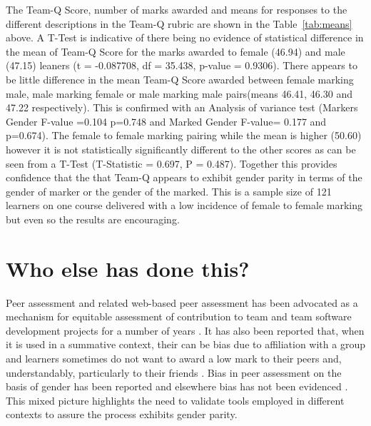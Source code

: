\documentclass[sigconf, anonymous=true]{acmart}
\begin{document}
The Team-Q Score, number of marks awarded and means for responses to the different descriptions in the Team-Q rubric are shown in the Table~\ref{tab:means} above. A T-Test is indicative of there being no evidence of statistical difference in the mean of Team-Q Score for the marks awarded to female (46.94) and male (47.15) leaners (t = -0.087708, df = 35.438, p-value = 0.9306).  There appears to be little difference in the mean Team-Q Score awarded between female marking male, male marking female or male marking male pairs(means 46.41, 46.30 and 47.22 respectively). This is confirmed with an Analysis of variance test (Markers Gender F-value =0.104 p=0.748 and Marked Gender F-value= 0.177 and p=0.674). The female to female marking pairing while the mean is higher (50.60) however it is not statistically significantly different to the other scores as can be seen from a T-Test (T-Statistic = 0.697, P = 0.487). Together this provides confidence that the that Team-Q appears to exhibit gender parity in terms of the gender of marker or the gender of the marked. This is a sample size of 121 learners on one course delivered with a low incidence of female to female marking but even so the results are encouraging.


\section{Who else has done this?}
Peer assessment and related web-based peer assessment has been advocated as a mechanism for equitable assessment of contribution to team and team software development projects for a number of years \cite{Clark2005,Raban_Litchfield_2007, Gordon2010,Fagerholm, Britton2017,Philips21}. It has also been reported that, when it is used in a summative context, their can be bias due to affiliation with a group \cite{Cestone2008} and learners sometimes do not want to award a low mark to their peers and, understandably, particularly to their friends \cite{Sridharam2003}.  Bias in peer assessment on the basis of gender has been reported \cite{Heels2019,Stonewall2018} and elsewhere bias has not been evidenced \cite{Tucker2014,Falchikov1997}. This mixed picture highlights the need to validate tools employed in different contexts to assure the process exhibits gender parity.
\end{document}
